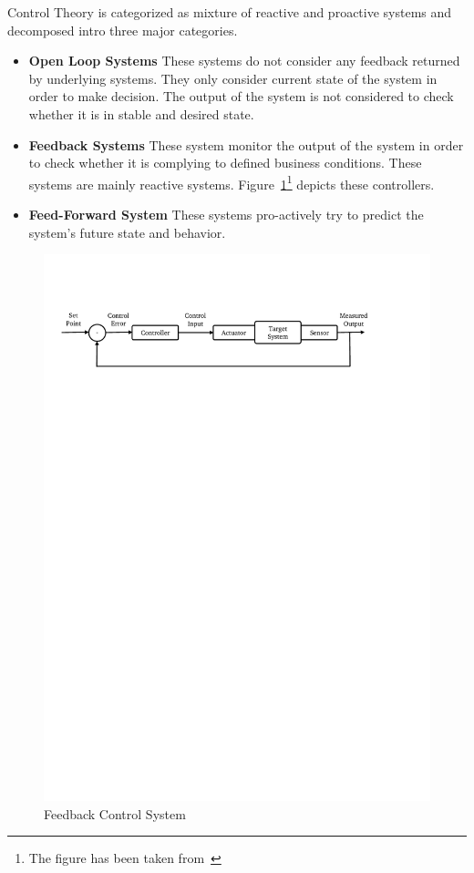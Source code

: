 Control Theory is categorized as mixture of reactive and proactive systems and decomposed intro three major categories.
\begin{itemize}
    \item \textbf{Open Loop Systems} These systems do not consider any feedback returned by underlying systems. They only consider current state of the system in order to make decision. The output of the system is not considered to check whether it is in stable and desired state.
    \item \textbf{Feedback Systems} These system monitor the output of the system in order to check whether it is complying to defined business conditions. These systems are mainly reactive systems. Figure~\ref{fig:feedback}\footnote{The figure has been taken from~\textcite{Patikirikorala:2018}} depicts these controllers.
    \item \textbf{Feed-Forward System} These systems pro-actively try to predict the system's future state and behavior. 
\end{itemize}
\begin{figure}[h]
    \centering
    \includegraphics[clip, trim=1.2cm 23.5cm 3.4cm 3cm]{control.pdf}
    \caption{Feedback Control System}
    \label{fig:feedback}
\end{figure}

